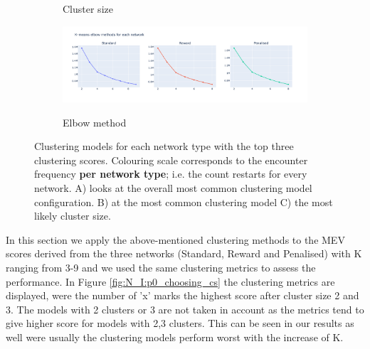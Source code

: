 \begin{figure}[!htb]
\begin{subfigure}[b]{0.49\textwidth}
        \caption{Cluster size}
    \end{subfigure}
     \hfill
    \begin{subfigure}[b]{0.49\textwidth}
        \centering
        \includegraphics[width=\textwidth, keepaspectratio]{Sections/Network_I/Resources/P0/p0_elbowMethod_4K.png}
        \label{fig:N_I:p0_elbow_method}
        \caption{Elbow method}
    \end{subfigure}
    \caption{Clustering models for each network type with the top three clustering scores. Colouring scale corresponds to the encounter frequency \textbf{per network type}; i.e. the count restarts for every network. A) looks at the overall most common clustering model configuration. B) at the most common clustering model C) the most likely cluster size.}
    \label{fig:N_I:p0_top_3_metrics}
\end{figure}


In this section we apply the above-mentioned clustering methods to the MEV scores derived from the three networks (Standard, Reward and Penalised) with K ranging from 3-9 and we used the same clustering metrics to assess the performance. In Figure \ref{fig:N_I:p0_choosing_cs} the clustering metrics are displayed, were the number of 'x' marks the highest score after cluster size 2 and 3. The models with 2 clusters or 3 are not taken in account as the metrics tend to give higher score for models with 2,3 clusters. This can be seen in our results as well were usually the clustering models perform worst with the increase of K. 

